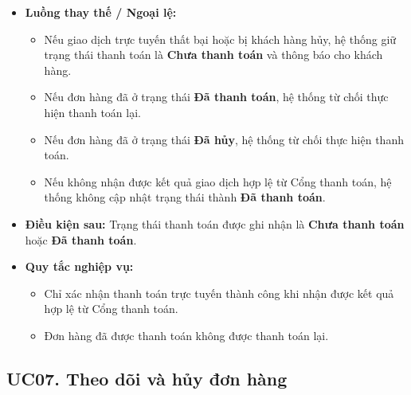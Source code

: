 \documentclass[12pt,a4paper]{article}
\begin{document}
\begin{itemize}
\item \textbf{Luồng thay thế / Ngoại lệ:}

\begin{itemize}

    \item Nếu giao dịch trực tuyến thất bại hoặc bị khách hàng hủy, hệ thống giữ trạng thái thanh toán là \textbf{Chưa thanh toán} và thông báo cho khách hàng.

    \item Nếu đơn hàng đã ở trạng thái \textbf{Đã thanh toán}, hệ thống từ chối thực hiện thanh toán lại.

    \item Nếu đơn hàng đã ở trạng thái \textbf{Đã hủy}, hệ thống từ chối thực hiện thanh toán.

    \item Nếu không nhận được kết quả giao dịch hợp lệ từ Cổng thanh toán, hệ thống không cập nhật trạng thái thành \textbf{Đã thanh toán}.

\end{itemize}

 \item \textbf{Điều kiện sau:} Trạng thái thanh toán được ghi nhận là \textbf{Chưa thanh toán} hoặc \textbf{Đã thanh toán}.

 \item \textbf{Quy tắc nghiệp vụ:}

 \begin{itemize}

  \item Chỉ xác nhận thanh toán trực tuyến thành công khi nhận được kết quả hợp lệ từ Cổng thanh toán.

  \item Đơn hàng đã được thanh toán không được thanh toán lại.

 \end{itemize}

\end{itemize}


\subsection*{UC07. Theo dõi và hủy đơn hàng}
\end{document}
